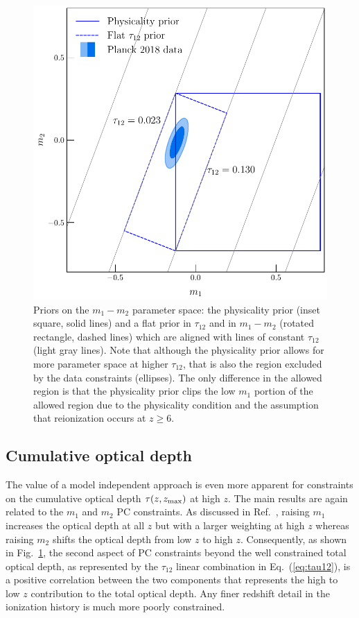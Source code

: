 \documentclass[prd,twocolumn,amsmath,amssymb,floatfix,superscriptaddress,nofootinbib]{revtex4-1}
\newcommand{\zmax}{z_{\rm max}}
\newcommand{\ch}[1]{\textcolor{red}{#1}}
\begin{document}
{ \begin{figure}
          \includegraphics[width=0.9\columnwidth]{paper/plots/pl18_pc_zmax30_pliklite_srollv2_1015_plot_rotated_box_flat_tau12.pdf}
          \caption {Priors on the $m_1-m_2$ parameter space: the physicality prior (inset square, solid lines) and a flat prior in
           $\tau_{12}$ and in $m_1-m_2$ (rotated rectangle, dashed lines) 
           which are aligned with lines of constant $\tau_{12}$ (light gray lines). Note that although the physicality prior allows for more parameter space at higher $\tau_{12}$, that is also the region excluded by the data constraints (ellipses). The only difference in the allowed region is that the physicality prior clips the low $m_1$ portion of the allowed region due to the physicality condition and the assumption that reionization occurs at $z\ge 6$.} 
          \label{fig:prior_box}
\end{figure}


%
%
%
\subsection{Cumulative optical depth}

The value of a model independent approach is even more apparent for constraints on the
cumulative optical depth $\tau(z, \zmax)$ at high $z$.
The main results are again related to the $m_1$ and $m_2$ PC constraints. 
As discussed in Ref.~\cite{Heinrich:2016ojb}, raising $m_1$ increases the  optical depth  at all $z$ but with a larger weighting at high $z$ whereas
raising $m_2$ shifts the optical depth from low $z$ to high $z$.  
Consequently, as shown in Fig.~\ref{fig:prior_box}, the second aspect of PC constraints beyond the well constrained total optical depth, as represented by the $\tau_{12}$ linear combination in Eq.~(\ref{eq:tau12}), is a positive
correlation between the two components that represents the high to low $z$ 
contribution to the total optical depth.  Any finer redshift detail in the ionization history is much more poorly constrained.

}
\end{document}
